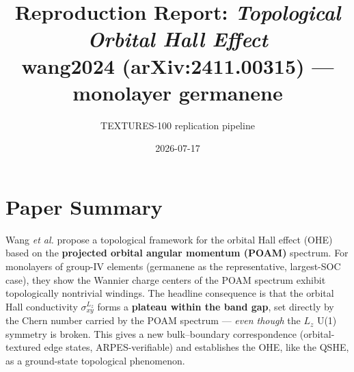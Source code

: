 \documentclass[11pt]{article}
\title{Reproduction Report: \emph{Topological Orbital Hall Effect}\\
\large wang2024 (arXiv:2411.00315) --- monolayer germanene}
\author{TEXTURES-100 replication pipeline}
\date{2026-07-17}
\begin{document}
\maketitle

\begin{center}
\end{center}

\section{Paper Summary}
Wang \emph{et al.} propose a topological framework for the orbital Hall effect (OHE)
based on the \textbf{projected orbital angular momentum (POAM)} spectrum. For
monolayers of group-IV elements (germanene as the representative, largest-SOC case),
they show the Wannier charge centers of the POAM spectrum exhibit topologically
nontrivial windings. The headline consequence is that the orbital Hall conductivity
$\sigma^{L_z}_{xy}$ forms a \textbf{plateau within the band gap}, set directly by the
Chern number carried by the POAM spectrum --- \emph{even though} the $L_z$ U(1)
symmetry is broken. This gives a new bulk--boundary correspondence (orbital-textured
edge states, ARPES-verifiable) and establishes the OHE, like the QSHE, as a
ground-state topological phenomenon.
\end{document}
